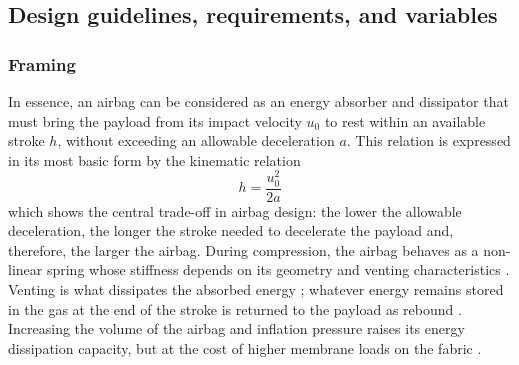 \subsection{Design guidelines, requirements, and variables}\label{section:airbag-design-guidelines}
\subsubsection{Framing}
In essence, an airbag can be considered as an energy absorber and dissipator that must bring the payload from its impact velocity $u_0$ to rest within an available stroke $h$, without exceeding an allowable deceleration $a$. This relation is expressed in its most basic form by the kinematic relation \cite{Smith2007,Crane1985}
\begin{equation}
    h = \frac{u_0^2}{2a}
    \label{eq:basic-stroke-calc}
\end{equation}
which shows the central trade-off in airbag design: the lower the allowable deceleration, the longer the stroke needed to decelerate the payload and, therefore, the larger the airbag. During compression, the airbag behaves as a non-linear spring whose stiffness depends on its geometry and venting characteristics \cite{DoDeWeck2012,Zhou2019,Cole1993}. Venting is what dissipates the absorbed energy \cite{DoDeWeck2012}; whatever energy remains stored in the gas at the end of the stroke is returned to the payload as rebound \cite{WarrickLee2001}. Increasing the volume of the airbag and inflation pressure raises its energy dissipation capacity, but at the cost of higher membrane loads on the fabric \cite{Smith2007,DoDeWeck2012}.

